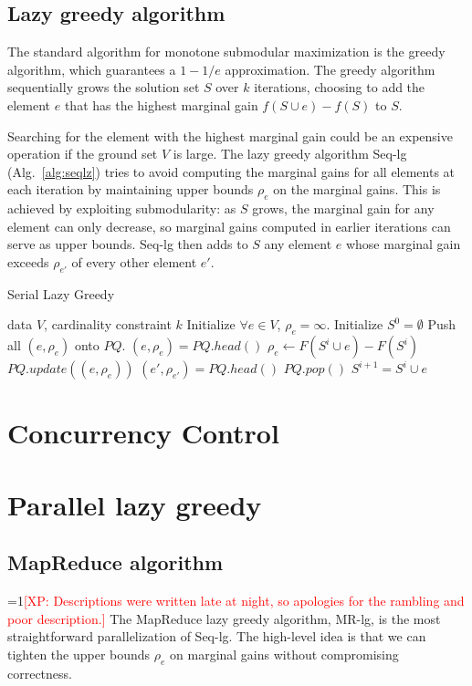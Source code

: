 \documentclass{article}
\newcommand{\Comments}{1}
\newcommand{\note}[2]{\ifnum\Comments=1\textcolor{#1}{#2}\fi}
\newcommand{\xinghao}[1]{\note{red}{[XP: #1]}}
\newcommand{\algref}[1]{Alg.~\ref{#1}}
\newcommand{\seqlz}{Seq-lg}
\newcommand{\mrlz}{MR-lg}
\begin{document}
\subsection{Lazy greedy algorithm}
The standard algorithm for monotone submodular maximization is the greedy algorithm, which guarantees a $1 -1/e$ approximation.
The greedy algorithm sequentially grows the solution set $S$ over $k$ iterations, choosing to add the element $e$ that has the highest marginal gain $f(S \cup e) - f(S)$ to $S$.

Searching for the element with the highest marginal gain could be an expensive operation if the ground set $V$ is large.
The lazy greedy algorithm \seqlz{} (\algref{alg:seqlz}) tries to avoid computing the marginal gains for all elements at each iteration by maintaining upper bounds $\rho_e$ on the marginal gains.
This is achieved by exploiting submodularity: as $S$ grows, the marginal gain for any element can only decrease, so marginal gains computed in earlier iterations can serve as upper bounds.
\seqlz{} then adds to $S$ any element $e$ whose marginal gain exceeds $\rho_{e'}$ of every other element $e'$.
\begin{algorithm}[tb]
  \caption{Serial Lazy Greedy}
  \label{alg:seqlz}
\begin{algorithmic}[1]
   data $V$, cardinality constraint $k$
  \STATE Initialize $\forall e \in V$, $\rho_e = \infty$.
  \STATE Initialize $S^0 = \emptyset$
  \STATE Push all $(e, \rho_e)$ onto $PQ$.
      \STATE $(e, \rho_e) = PQ.head()$
      \STATE $\rho_e \leftarrow F(S^i\cup e) - F(S^i)$
      \STATE $PQ.update((e,\rho_e))$
      \STATE $(e', \rho_{e'}) = PQ.head()$
        \STATE $PQ.pop()$
        \STATE $S^{i+1} = S^i \cup e$
      \ENDIF
    \ENDWHILE
  \ENDFOR
\end{algorithmic}
\end{algorithm}


\section{Concurrency Control}
\label{sec:concurrencycontrol}

\section{Parallel lazy greedy}
\label{sec:parlazy}

\subsection{MapReduce algorithm}
\xinghao{Descriptions were written late at night, so apologies for the rambling and poor description.}
The MapReduce lazy greedy algorithm, \mrlz{}, is the most straightforward parallelization of \seqlz{}.
The high-level idea is that we can tighten the upper bounds $\rho_e$ on marginal gains without compromising correctness.
\end{document}

